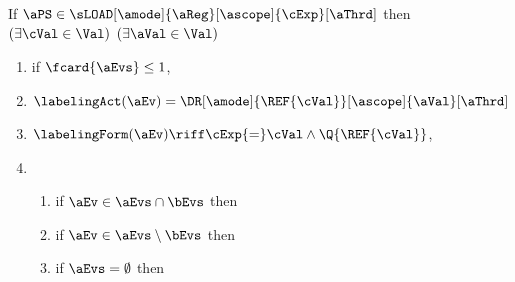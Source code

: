 \begin{scope}
  \smallskip
  \noindent
  If $\aPS \in \sLOAD[\amode]{\aReg}[\ascope]{\cExp}[\aThrd]$ then
  $(\exists\cVal\in\Val)$
  $(\exists\aVal\in\Val)$
  \begin{multicols}{2}
    \begin{enumerate}[topsep=0pt,label=(\textsc{r}\arabic*),ref=\textsc{r}\arabic*]
    \item \label{read-E-addr}
      if $\fcard{\aEvs}\leq1$,
    \item \label{read-lambda-addr}
      $\labelingAct(\aEv) = \DR[\amode]{\REF{\cVal}}[\ascope]{\aVal}[\aThrd]$
    \item \label{read-kappa-addr}
      \begin{math}
        \labelingForm(\aEv) 
        \riff
        \cExp{=}\cVal
        \land \Q{\REF{\cVal}}
      \end{math},
    \item[] 
      \begin{enumerate}[leftmargin=0pt]
      \item \label{read-tau-dep-addr}
        if $\aEv\in\aEvs\cap\bEvs$ then
        \makebox[0pt][l]{\begin{math}
            \aTr{\bEvs}{\bForm} \riff
            (\cExp{=}\cVal\limplies\aVal{=}\uReg{\aEv})
            \limplies \bForm[\uReg{\aEv}/\aReg]
          \end{math},}
      \item \label{read-tau-ind-addr}
        if $\aEv\in\aEvs\setminus\bEvs$ then
        \makebox[0pt][l]{\begin{math}
            \aTr{\bEvs}{\bForm} \riff
            \PBR{
              (\cExp{=}\cVal\limplies\aVal{=}\uReg{\aEv})
              \lor
              ((\cExp{=}\cVal\land\A{\cVal})\limplies\REF{\cVal}\EQ\uReg{\aEv})
            }
            \limplies
            \bForm[\uReg{\aEv}/\aReg]
          \end{math},}
        \columnbreak
      \item \label{read-tau-empty-addr}
        if $\aEvs=\emptyset$ then 

\end{enumerate}
\end{enumerate}
\end{multicols}
\end{scope}
